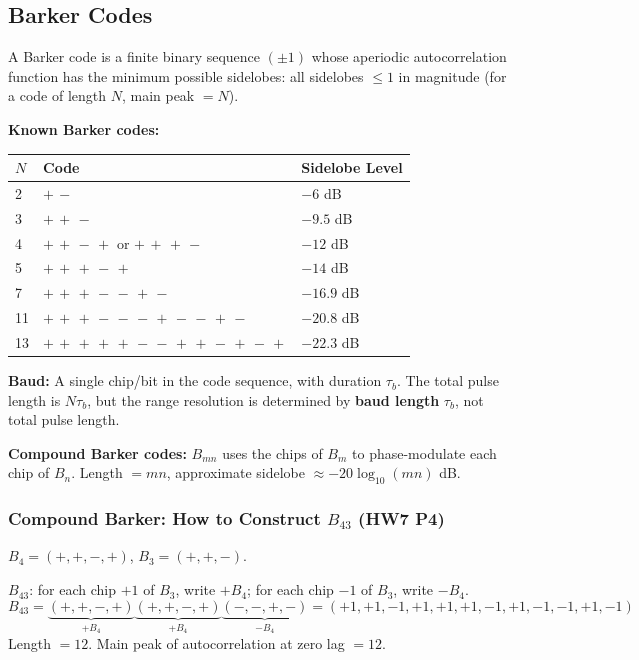\documentclass[10pt,letterpaper]{article}
\begin{document}
\subsection{Barker Codes}

\begin{tcolorbox}[keybox, title={Barker Codes -- Properties \& Use}]
A Barker code is a finite binary sequence $(\pm1)$ whose aperiodic autocorrelation function has the minimum possible sidelobes: all sidelobes $\leq 1$ in magnitude (for a code of length $N$, main peak $= N$).

\textbf{Known Barker codes:}
\begin{center}
\begin{tabular}{lll}
\toprule
\textbf{$N$} & \textbf{Code} & \textbf{Sidelobe Level} \\
\midrule
2 & $+\,-$ & $-6$ dB \\
3 & $+\,+\,-$ & $-9.5$ dB \\
4 & $+\,+\,-\,+$ or $+\,+\,+\,-$ & $-12$ dB \\
5 & $+\,+\,+\,-\,+$ & $-14$ dB \\
7 & $+\,+\,+\,-\,-\,+\,-$ & $-16.9$ dB \\
11 & $+\,+\,+\,-\,-\,-\,+\,-\,-\,+\,-$ & $-20.8$ dB \\
13 & $+\,+\,+\,+\,+\,-\,-\,+\,+\,-\,+\,-\,+$ & $-22.3$ dB \\
\bottomrule
\end{tabular}
\end{center}
\textbf{Baud:} A single chip/bit in the code sequence, with duration $\tau_b$. The total pulse length is $N\tau_b$, but the range resolution is determined by \textbf{baud length} $\tau_b$, not total pulse length.

\textbf{Compound Barker codes:} $B_{mn}$ uses the chips of $B_m$ to phase-modulate each chip of $B_n$. Length $= mn$, approximate sidelobe $\approx -20\log_{10}(mn)$ dB.
\end{tcolorbox}

\subsubsection{Compound Barker: How to Construct $B_{43}$ (HW7 P4)}
$B_4 = (+,+,-,+)$, $B_3 = (+,+,-)$.

$B_{43}$: for each chip $+1$ of $B_3$, write $+B_4$; for each chip $-1$ of $B_3$, write $-B_4$.
\[B_{43} = \underbrace{(+,+,-,+)}_{+B_4}\underbrace{(+,+,-,+)}_{+B_4}\underbrace{(-,-,+,-)}_{-B_4} = (+1,+1,-1,+1,+1,+1,-1,+1,-1,-1,+1,-1)\]
Length $= 12$. Main peak of autocorrelation at zero lag $= 12$.
\end{document}
